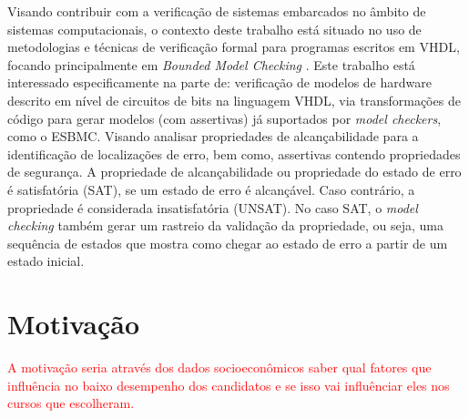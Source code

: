 \par
Visando contribuir com a verificação de sistemas embarcados no âmbito de sistemas computacionais, o contexto deste trabalho está situado no uso de metodologias e técnicas de verificação formal para programas escritos em VHDL\cite{biere2016aiger}, focando principalmente em \textit{Bounded Model Checking} \cite{cordeiro2012smt,rocha2015model}. Este trabalho está interessado especificamente na parte de: verificação de modelos de hardware descrito em nível de circuitos de bits na linguagem VHDL, via transformações de código para gerar modelos (com assertivas) já suportados por \textit{model checkers}, como o ESBMC\cite{cordeiro2012smt}. Visando analisar propriedades de alcançabilidade para a identificação de localizações de erro, bem como, assertivas contendo propriedades de segurança. A propriedade de alcançabilidade ou propriedade do estado de erro é satisfatória (SAT), se um estado de erro é alcançável. Caso contrário, a propriedade é considerada insatisfatória (UNSAT). No caso SAT, o \textit{model checking} também gerar um rastreio da validação da propriedade, ou seja, uma sequência de estados que mostra como chegar ao estado de erro a partir de um estado inicial.


\section{Motivação}

\textcolor{red}{A motivação seria através dos dados socioeconômicos saber qual fatores que influência no baixo desempenho dos candidatos e se isso vai influênciar eles nos cursos que escolheram.}
% 

